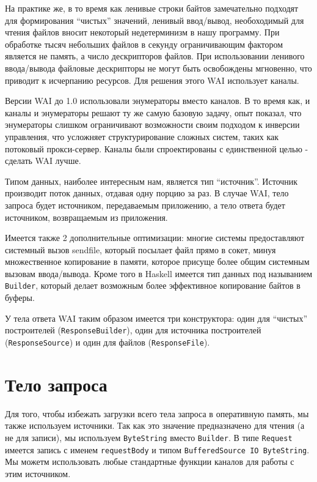 На практике же, в то время как ленивые строки байтов замечательно подходят для формирования
``чистых'' значений, ленивый ввод/вывод, необоходимый для чтения файлов вносит некоторый
недетерминизм в нашу программу. При обработке тысяч небольших файлов в секунду ограничивающим
фактором является не память, а число дескрипторов файлов. При использовании ленивого
ввода/вывода файловые дескрипторы не могут быть освобождены мгновенно, что приводит к
исчерпанию ресурсов. Для решения этого WAI использует каналы.

\begin{remark}
Версии WAI до 1.0 использовали энумераторы вместо каналов. В то время как, и каналы
и энумераторы решают ту же самую базовую задачу, опыт показал, что энумераторы слишком
ограничивают возможности своим подходом к инверсии управления, что усложняет структурирование
сложных систем, таких как потоковый прокси-сервер. Каналы были спроектированы
с единственной целью - сделать WAI лучше.
\end{remark}

Типом данных, наиболее интересным нам, является тип ``источник''. Источник производит
поток данных, отдавая одну порцию за раз. В случае WAI, тело запроса будет источником,
передаваемым приложению, а тело ответа будет источником, возвращаемым из приложения.

Имеется также 2 дополнительные оптимизации: многие системы предоставляют системный вызов sendfile, который
посылает файл прямо в сокет, минуя множественное копирование в памяти, которое присуще
более общим системным вызовам ввода/вывода. Кроме того в Haskell имеется тип данных
под называнием \lstinline!Builder!, который делает возможным более эффективное копирование
байтов в буферы.

У тела ответа WAI таким образом имеется три конструктора: один для ``чистых'' построителей
(\lstinline!ResponseBuilder!), один для источника построителей (\lstinline!ResponseSource!) и
один для файлов (\lstinline!ResponseFile!).

\section {Тело запроса}

Для того, чтобы избежать загрузки всего тела запроса в оперативную память, мы также используем
источники. Так как это значение предназначено для чтения (а не для записи), мы используем
\lstinline!ByteString! вместо \lstinline!Builder!. В типе \lstinline!Request! имеется
запись с именем \lstinline!requestBody! и типом \lstinline!BufferedSource IO ByteString!.
Мы можетм использовать любые стандартные функции каналов для работы с этим источником.

